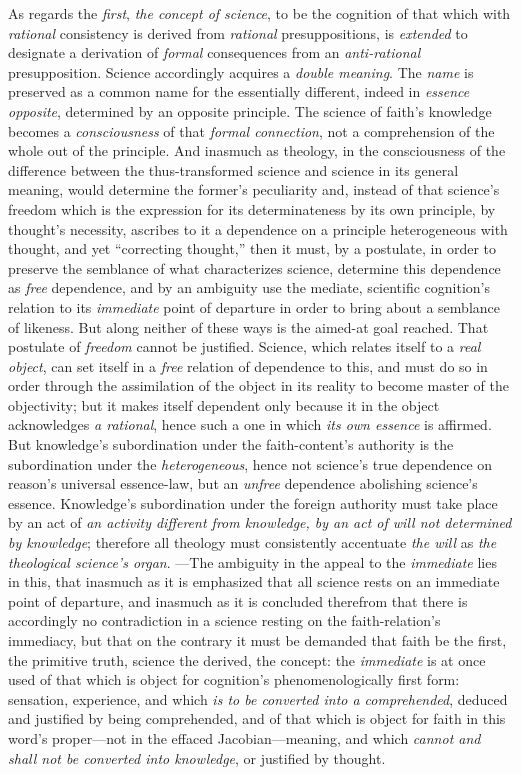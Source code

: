 \documentclass[12pt,a4paper]{book}
\begin{document}
As regards the \emph{first}, \emph{the concept of science}, to be the cognition of that which with \emph{rational}
consistency is derived from \emph{rational} presuppositions, is \emph{extended} to designate a derivation of
\emph{formal} consequences from an \emph{anti-rational} presupposition. Science accordingly acquires a
\emph{double meaning}. The \emph{name} is preserved as a common name for the essentially different, indeed in
\emph{essence opposite}, determined by an opposite principle. The science of faith's knowledge becomes
a \emph{consciousness} of that \emph{formal connection}, not a comprehension of the whole out of the
principle. And inasmuch as theology, in the consciousness of the difference between the
thus-transformed science and science in its general meaning, would determine the former's
peculiarity and, instead of that science's freedom which is the expression for its
determinateness by its own principle, by thought's necessity, ascribes to it a dependence on a
principle heterogeneous with thought, and yet ``correcting thought,'' then it must, by a
postulate, in order to preserve the semblance of what characterizes science, determine this
dependence as \emph{free} dependence, and by an ambiguity use the mediate, scientific cognition's
relation to its \emph{immediate} point of departure in order to bring about a semblance of likeness. But
along neither of these ways is the aimed-at goal reached. That postulate of \emph{freedom} cannot be
justified. Science, which relates itself to a \emph{real object}, can set itself in a \emph{free}
relation of dependence to this, and must do so in order through the assimilation of the object in
its reality to become master of the objectivity; but it makes itself dependent only because it in
the object acknowledges \emph{a rational}, hence such a one in which \emph{its own essence} is affirmed.
But knowledge's subordination under the faith-content's authority is the subordination under the
\emph{heterogeneous}, hence not science's true dependence on reason's universal essence-law, but an
\emph{unfree} dependence abolishing science's essence. Knowledge's subordination under the foreign
authority must take place by an act of \emph{an activity different from knowledge, by an act of will not
determined by knowledge}; therefore all theology must consistently accentuate \emph{the will} as \emph{the
theological science's organ}. ---The ambiguity in the appeal to the \emph{immediate} lies in this, that
inasmuch as it is emphasized that all science rests on an immediate point of departure, and inasmuch
as it is concluded therefrom that there is accordingly no contradiction in a science resting on the
faith-relation's immediacy, but that on the contrary it must be demanded that faith be the first,
the primitive truth, science the derived, the concept: the \emph{immediate} is at once used of that which
is object for cognition's phenomenologically first form: sensation, experience, and which \emph{is to be
converted into a comprehended}, deduced and justified by being comprehended, and of that which is
object for faith in this word's proper---not in the effaced Jacobian---meaning, and which \emph{cannot and
shall not be converted into knowledge}, or justified by thought.
\end{document}
